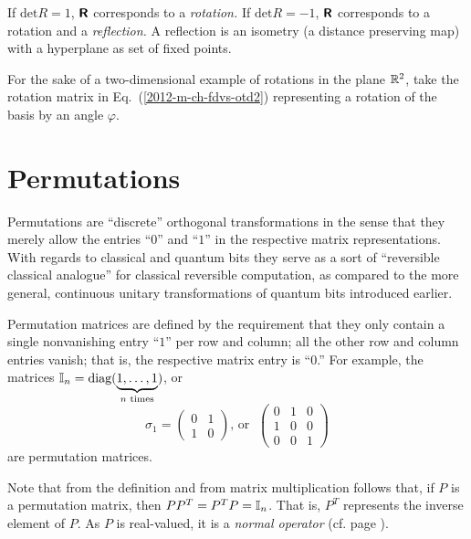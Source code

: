 If $\textrm{det} R=1$, $\textsf{\textbf{R}}$ corresponds to a {\em rotation.}
If $\textrm{det} R=-1$, $\textsf{\textbf{R}}$ corresponds to a rotation and a {\em reflection.}
A reflection is an isometry (a distance preserving map) with a hyperplane as set of fixed points.



{\color{blue}
\bexample
For the sake of a two-dimensional  example of rotations in the plane ${\Bbb R}^2$,
take the rotation matrix in Eq.~(\ref{2012-m-ch-fdvs-otd2})
representing a rotation of the basis by an angle $\varphi$.

\eexample
}


\section{Permutations}

Permutations are ``discrete'' orthogonal transformations in the sense that
they merely allow the entries ``$0$'' and ``$1$'' in the respective matrix representations.
With regards to classical and quantum bits \cite{mermin-04,mermin-07}
they serve as a sort of ``reversible classical analogue'' for classical reversible computation,
as compared to the more general, continuous unitary transformations of quantum bits introduced earlier.

Permutation matrices are defined by the requirement that they only contain a single nonvanishing entry ``$1$'' per row and column;
all the other row and column entries vanish; that is, the respective matrix entry is ``$0$.''
For example, the matrices ${\Bbb I}_n=\textrm{diag}(\underbrace{1,\ldots ,1}_{n \textrm{ times}})$,
or
$$
\sigma_1=
\begin{pmatrix}
0&1\\
1&0
\end{pmatrix}
\textrm{, or }\;
\begin{pmatrix}
0&1&0\\
1&0&0\\
0&0&1
\end{pmatrix}
$$
are permutation matrices.

Note that from the definition and from matrix multiplication follows that,
if $P$ is a permutation matrix, then $PP^T=P^T P={\Bbb I}_n$.
That is, $P^T$ represents the inverse element of $P$.
As $P$ is real-valued, it is a {\em normal operator} (cf. page \pageref{2014-m-fdvs-normality}).


